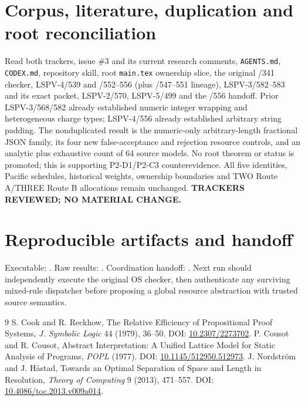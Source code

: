 \documentclass[11pt]{article}
\begin{document}
\section*{Corpus, literature, duplication and root reconciliation}
Read both trackers, issue \#3 and its current research comments,
\texttt{AGENTS.md}, \texttt{CODEX.md}, repository skill,
root \texttt{main.tex} ownership slice, the original /341 checker,
LSPV-4/539 and /552--556 (plus /547--551 lineage),
LSPV-3/582--583 and its exact packet, LSPV-2/570,
LSPV-5/499 and the /556 handoff. Prior LSPV-3/568/582
already established numeric integer wrapping and heterogeneous
charge types; LSPV-4/556 already established arbitrary string padding.
The nonduplicated result is the numeric-only arbitrary-length fractional
JSON family, its four new false-acceptance and rejection resource
controls, and an analytic plus exhaustive count of 64 source models.
No root theorem or status is promoted; this is supporting P2-D1/P2-C3
counterevidence. All five identities, Pacific schedules,
historical weights, ownership boundaries and TWO Route A/THREE Route B
allocations remain unchanged. \textbf{TRACKERS REVIEWED; NO MATERIAL CHANGE.}

\section*{Reproducible artifacts and handoff}
Executable: .
Raw results:
.
Coordination handoff:
.
Next run should independently execute the original OS checker,
then authenticate any surviving mixed-rule dispatcher before
proposing a global resource abstraction with trusted source semantics.

\begin{thebibliography}{9}
 S. Cook and R. Reckhow, The Relative Efficiency of Propositional
Proof Systems, \emph{J. Symbolic Logic} 44 (1979), 36--50.
DOI: \href{https://doi.org/10.2307/2273702}{10.2307/2273702}.
 P. Cousot and R. Cousot, Abstract Interpretation: A Unified Lattice
Model for Static Analysis of Programs, \emph{POPL} (1977).
DOI: \href{https://doi.org/10.1145/512950.512973}{10.1145/512950.512973}.
 J. Nordstr\"om and J. H{\aa}stad, Towards an Optimal Separation
of Space and Length in Resolution, \emph{Theory of Computing} 9 (2013),
471--557. DOI: \href{https://doi.org/10.4086/toc.2013.v009a014}{10.4086/toc.2013.v009a014}.
\end{thebibliography}
\end{document}
